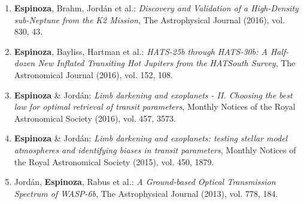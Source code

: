 \documentclass[12pt, a4paper]{article} %
\begin{document}
\begin{flushleft}
\begin{enumerate}
\item \textbf{Espinoza}, Brahm, Jord\'an et al.: \textit{Discovery and Validation of a High-Density sub-Neptune from the K2 Mission}, The Astrophysical Journal (2016), vol. 830, 43.
\item \textbf{Espinoza}, Bayliss, Hartman et al.: \textit{HATS-25b through HATS-30b: A Half-dozen New Inflated Transiting Hot Jupiters from the HATSouth Survey}, The Astronomical Journal (2016), vol. 152, 108.
\item \textbf{Espinoza} \& Jord\'an: \textit{Limb darkening and exoplanets - II. Choosing the best law for optimal retrieval of transit parameters}, Monthly Notices of the Royal Astronomical Society (2016), vol. 457, 3573.
\item \textbf{Espinoza} \& Jord\'an: \textit{Limb darkening and exoplanets: testing stellar model atmospheres and identifying biases in transit parameters}, Monthly Notices of the Royal Astronomical Society (2015), vol. 450, 1879.
\item Jord\'an, \textbf{Espinoza}, Rabus et al.: \textit{A Ground-based Optical Transmission Spectrum of WASP-6b}, The Astrophysical Journal (2013), vol. 778, 184.
\end{enumerate}


\end{flushleft}
\end{document}
